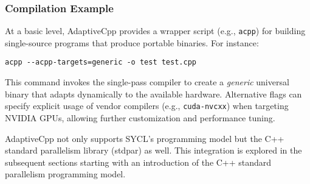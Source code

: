 \subsubsection*{Compilation Example}

At a basic level, AdaptiveCpp provides a wrapper script (e.g., \texttt{acpp}) for building single-source programs
that produce portable binaries. For instance:

\begin{verbatim}
acpp --acpp-targets=generic -o test test.cpp
\end{verbatim}

This command invokes the single-pass compiler to create a \textit{generic} universal binary that adapts 
dynamically to the available hardware. Alternative flags can specify explicit usage of vendor compilers 
(e.g., \texttt{cuda-nvcxx}) when targeting NVIDIA GPUs, allowing further customization and performance tuning.

AdaptiveCpp not only supports SYCL’s programming model but the C++ standard parallelism library (stdpar) as well.
This integration is explored in the subsequent sections starting with an introduction of the C++ standard parallelism programming model.
